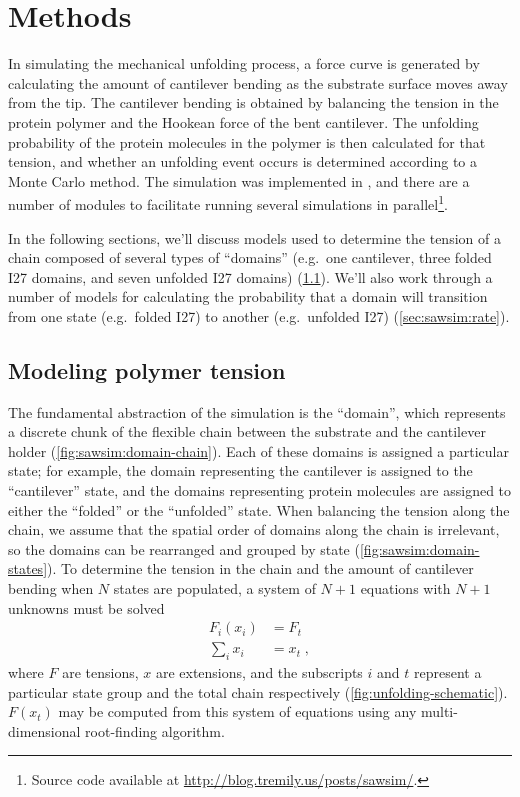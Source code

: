 \section{Methods}
\label{sec:sawsim:methods}

In simulating the mechanical unfolding process, a force curve is
generated by calculating the amount of cantilever bending as the
substrate surface moves away from the tip.  The cantilever bending is
obtained by balancing the tension in the protein polymer and the
Hookean force of the bent cantilever.  The unfolding probability of
the protein molecules in the polymer is then calculated for that
tension, and whether an unfolding event occurs is determined according
to a Monte Carlo method.  The simulation was implemented in
, and there are a number of
 modules to facilitate running several simulations
in parallel\footnote{
  Source code available at \url{http://blog.tremily.us/posts/sawsim/}.
}.

In the following sections, we'll discuss models used to determine the
tension of a chain composed of several types of ``domains'' (e.g.~one
cantilever, three folded I27 domains, and seven unfolded I27 domains)
(\cref{sec:sawsim:tension}).  We'll also work through a number of
models for calculating the probability that a domain will transition
from one state (e.g.~folded I27) to another (e.g.~unfolded I27)
(\cref{sec:sawsim:rate}).

\subsection{Modeling polymer tension}
\label{sec:sawsim:tension}

The fundamental abstraction of the simulation is the ``domain'', which
represents a discrete chunk of the flexible chain between the
substrate and the cantilever holder (\cref{fig:sawsim:domain-chain}).
Each of these domains is assigned a particular state; for example, the
domain representing the cantilever is assigned to the ``cantilever''
state, and the domains representing protein molecules are assigned to
either the ``folded'' or the ``unfolded'' state.  When balancing the
tension along the chain, we assume that the spatial order of domains
along the chain is irrelevant\citep{li00}, so the domains can be
rearranged and grouped by state (\cref{fig:sawsim:domain-states}).  To
determine the tension in the chain and the amount of cantilever
bending when $N$ states are populated, a system of $N+1$ equations
with $N+1$ unknowns must be solved
\begin{align}
  F_i(x_i) &= F_t        \label{eq:sawsim:tension-balance} \\
  \sum_i x_i &= x_t \;,  \label{eq:sawsim:x-total}
\end{align}
where $F$ are tensions, $x$ are extensions, and the subscripts $i$ and
$t$ represent a particular state group and the total chain
respectively (\cref{fig:unfolding-schematic}).  $F(x_t)$ may be
computed from this system of equations using any multi-dimensional
root-finding algorithm.

